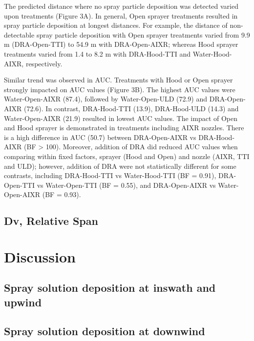 \documentclass[
  12pt,
  a4paper,
]{article}
\begin{document}
The predicted distance where no spray particle deposition was detected
varied upon treatments (Figure 3A). In general, Open sprayer treatments
resulted in spray particle deposition at longest distances. For example,
the distance of non-detectable spray particle deposition with Open
sprayer treatments varied from 9.9 m (DRA-Open-TTI) to 54.9 m with
DRA-Open-AIXR; whereas Hood sprayer treatments varied from 1.4 to 8.2 m
with DRA-Hood-TTI and Water-Hood-AIXR, respectively.

Similar trend was observed in AUC. Treatments with Hood or Open sprayer
strongly impacted on AUC values (Figure 3B). The highest AUC values were
Water-Open-AIXR (87.4), followed by Water-Open-ULD (72.9) and
DRA-Open-AIXR (72.6). In contrast, DRA-Hood-TTI (13.9), DRA-Hood-ULD
(14.3) and Water-Open-AIXR (21.9) resulted in lowest AUC values. The
impact of Open and Hood sprayer is demonstrated in treatments including
AIXR nozzles. There is a high difference in AUC (50.7) between
DRA-Open-AIXR vs DRA-Hood-AIXR (BF \textgreater{} 100). Moreover,
addition of DRA did reduced AUC values when comparing within fixed
factors, sprayer (Hood and Open) and nozzle (AIXR, TTI and ULD);
however, addition of DRA were not statistically different for some
contrasts, including DRA-Hood-TTI vs Water-Hood-TTI (BF = 0.91),
DRA-Open-TTI vs Water-Open-TTI (BF = 0.55), and DRA-Open-AIXR vs
Water-Open-AIXR (BF = 0.93).

\hypertarget{dv-relative-span-1}{%
\subsection{Dv, Relative Span}\label{dv-relative-span-1}}

\hypertarget{discussion}{%
\section{Discussion}\label{discussion}}

\hypertarget{spray-solution-deposition-at-inswath-and-upwind-1}{%
\subsection{Spray solution deposition at inswath and
upwind}\label{spray-solution-deposition-at-inswath-and-upwind-1}}

\hypertarget{spray-solution-deposition-at-downwind-2}{%
\subsection{Spray solution deposition at
downwind}\label{spray-solution-deposition-at-downwind-2}}
\end{document}
